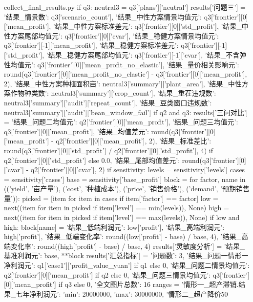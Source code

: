 \documentclass[bwprint]{gmcmthesis}
\begin{document}
\begin{appendices}
\begin{Python}{collect\_final\_results.py}
    if q3:
        neutral3 = q3['plans']['neutral']
        results['问题三'] = {'结果_情景数': q3['scenario_count'], '结果_中性方案情景均值元': q3['frontier'][0]['mean_profit'], '结果_中性方案标准差元': q3['frontier'][0]['std_profit'], '结果_中性方案尾部均值元': q3['frontier'][0]['cvar'], '结果_稳健方案情景均值元': q3['frontier'][-1]['mean_profit'], '结果_稳健方案标准差元': q3['frontier'][-1]['std_profit'], '结果_稳健方案尾部均值元': q3['frontier'][-1]['cvar'], '结果_不含弹性均值元': q3['frontier'][0]['mean_profit_no_elastic'], '结果_量价相关影响元': round(q3['frontier'][0]['mean_profit_no_elastic'] - q3['frontier'][0]['mean_profit'], 2), '结果_中性方案种植面积亩': neutral3['summary']['plant_area'], '结果_中性方案作物种类数': neutral3['summary']['crop_count'], '结果_重茬违规数': neutral3['summary']['audit']['repeat_count'], '结果_豆类窗口违规数': neutral3['summary']['audit']['bean_window_fail']}
    if q2 and q3:
        results['三问对比'] = {'结果_问题二均值元': q2['frontier'][0]['mean_profit'], '结果_问题三均值元': q3['frontier'][0]['mean_profit'], '结果_均值差元': round(q3['frontier'][0]['mean_profit'] - q2['frontier'][0]['mean_profit'], 2), '结果_标准差比': round(q3['frontier'][0]['std_profit'] / q2['frontier'][0]['std_profit'], 4) if q2['frontier'][0]['std_profit'] else 0.0, '结果_尾部均值差元': round(q3['frontier'][0]['cvar'] - q2['frontier'][0]['cvar'], 2)}
    if sensitivity:
        levels = sensitivity['levels']
        cases = sensitivity['cases']
        base = sensitivity['base_profit']
        block = {}
        for factor, name in (('yield', '亩产量'), ('cost', '种植成本'), ('price', '销售价格'), ('demand', '预期销售量')):
            picked = [item for item in cases if item['factor'] == factor]
            low = next((item for item in picked if item['level'] == min(levels)), None)
            high = next((item for item in picked if item['level'] == max(levels)), None)
            if low and high:
                block[name] = {'结果_低端利润元': low['profit'], '结果_高端利润元': high['profit'], '结果_低端变化率': round((low['profit'] - base) / base, 4), '结果_高端变化率': round((high['profit'] - base) / base, 4)}
        results['灵敏度分析'] = {'结果_基准利润元': base, **block}
    results['汇总指标'] = {'问题数': 3, '结果_问题一情形一净利润元': q1['case1']['profit_value_yuan'] if q1 else 0, '结果_问题二情景均值元': q2['frontier'][0]['mean_profit'] if q2 else 0, '结果_问题三情景均值元': q3['frontier'][0]['mean_profit'] if q3 else 0, '全文图片总数': 16}
    ranges = {'情形一_超产滞销.结果_七年净利润元': {'min': 20000000, 'max': 30000000}, '情形二_超产降价50%
}
\end{Python}
\end{appendices}
\end{document}
